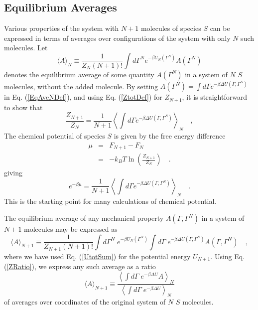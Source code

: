\documentclass[12pt]{article}
\newcommand\system{\Gamma^{N}}
\newcommand\chain{\Gamma}
\newcommand\Utot{U_{N+1}}
\newcommand\Usys{U_{N}}
\newcommand\delU{\Delta U}
\newcommand\Ztot{Z_{N+1}}
\newcommand\Zsystem{Z_{N}}
\newcommand\Ftot{F_{N+1}}
\newcommand\Fsystem{F_{N}}
\begin{document}
\subsection{Equilibrium Averages}
Various properties of the system with $N+1$ molecules of species $S$ can be expressed in terms of averages over configurations of the system with only $N$ such molecules. Let
\begin{equation}
  \langle A \rangle_{N} \equiv \frac{1}{\Zsystem (N+1)!}
  \int d\system e^{-\beta \Usys(\system)} A(\system)
  \label{EqAveNDef}
\end{equation}
denotes the equilibrium average of some quantity $A(\system)$ in a system of $N$ $S$ molecules, without the added molecule. 
By setting $A(\system) = \int d\chain e^{-\beta \delU(\chain, \system)}$ in Eq. (\ref{EqAveNDef}), and using Eq. (\ref{ZtotDef}) for $\Ztot$, it is straightforward to show that
\begin{equation}
  \frac{\Ztot}{\Zsystem} = \frac{1}{N+1}
  \left\langle \int d\chain e^{-\beta \delU(\chain, \system)} \right\rangle_{N}
  \quad, \label{ZRatio}
\end{equation}
The chemical potential of species $S$ is given by the free energy difference
\begin{eqnarray}
   \mu & = & \Ftot - \Fsystem \nonumber \\
       & = & -k_{B}T \ln \left ( \frac{\Ztot}{\Zsystem} \right )
   \quad. \label{mudef}
\end{eqnarray}
giving
\begin{equation}
  e^{-\beta\mu} = \frac{1}{N+1}
  \left\langle \int d\chain e^{-\beta \delU(\chain, \system)} \right\rangle_{N}
  \quad. \label{ZRatio}
\end{equation}
This is the starting point for many calculations of chemical potential.

The equilibrium average of any mechanical property $A(\chain, \system)$ in a system of $N+1$ molecules may be expressed as
\begin{equation}
  \langle A \rangle_{N+1} \equiv \frac{1}{\Ztot (N+1)!}
  \int d\system \; e^{-\beta \Usys(\system)} \int d\chain \; e^{-\beta \delU(\chain, \system)} 
       A(\chain, \system) \quad,
\end{equation}
where we have used Eq. (\ref{UtotSum}) for the potential energy $\Utot$.  Using Eq. (\ref{ZRatio}), we express any such average as a ratio
\begin{equation}
  \langle A \rangle_{N+1} \equiv
  \frac{ \left \langle 
         \int d\chain \; e^{-\beta \delU} A
         \right \rangle_{N}}
         { \left \langle 
         \int d\chain \; e^{-\beta \delU} \right \rangle_{N}}
\end{equation}
of averages over coordinates of the original system of $N$ $S$ molecules.
\end{document}
